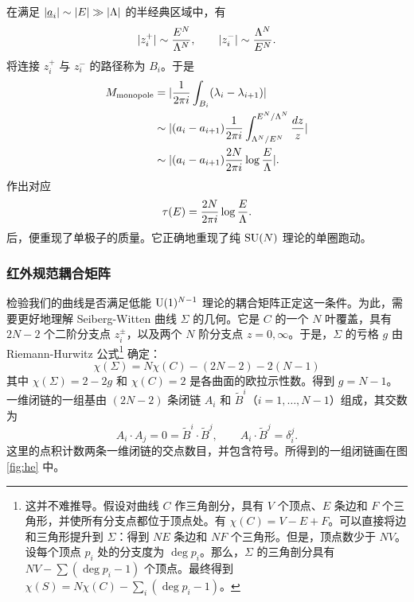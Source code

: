 在满足 $|\underline a_i|\sim|E|\gg|\Lambda|$ 的半经典区域中，有
\begin{equation}
|z_i^+|\sim\frac{E^N}{\Lambda^N},\qquad
|z_i^-|\sim\frac{\Lambda^N}{E^N}.
\end{equation}
将连接 $z_i^+$ 与 $z_i^-$ 的路径称为 $B_i$。于是
\begin{align}
M_\text{monopole}&=|\frac1{2\pi i}\int_{B_i}(\lambda_i-\lambda_{i+1})|\\
&\sim|(a_i-a_{i+1})\frac1{2\pi i}\int_{\Lambda^N/E^N}^{E^N/\Lambda^N}\frac{dz}z|\\
&\sim|(a_i-a_{i+1})\frac{2N}{2\pi i}\log\frac{E}\Lambda|.
\end{align}
作出对应
\begin{equation}
\tau(E)=\frac{2N}{2\pi i}\log\frac{E}\Lambda.
\end{equation}
后，便重现了单极子的质量。它正确地重现了纯 $\mathop{\mathrm{SU}}(N)$ 理论的单圈跑动。

\subsubsection{红外规范耦合矩阵}
检验我们的曲线是否满足低能 ${\mathrm{U}}(1)^{N-1}$ 理论的耦合矩阵正定这一条件。为此，需要更好地理解 Seiberg-Witten 曲线 $\Sigma$ 的几何。它是 $C$ 的一个 $N$ 叶覆盖，具有 $2N-2$ 个二阶分支点 $z_i^\pm$，以及两个 $N$ 阶分支点 $z=0,\infty$。于是，$\Sigma$ 的亏格 $g$ 由 Riemann-Hurwitz 公式\footnote{这并不难推导。假设对曲线 $C$ 作三角剖分，具有 $V$ 个顶点、$E$ 条边和 $F$ 个三角形，并使所有分支点都位于顶点处。有 $\chi(C)=V-E+F$。可以直接将边和三角形提升到 $\Sigma$：得到 $NE$ 条边和 $NF$ 个三角形。但是，顶点数少于 $NV$。设每个顶点 $p_i$ 处的分支度为 $\deg p_i$。那么，$\Sigma$ 的三角剖分具有 $NV-\sum(\deg p_i-1)$ 个顶点。最终得到 $\chi(S)=N\chi(C)-\sum_i(\deg p_i-1)$。} 确定：
\begin{equation}
\chi(\Sigma)=N\chi(C)-(2N-2)-2(N-1)
\end{equation}
其中 $\chi(\Sigma)=2-2g$ 和 $\chi(C)=2$ 是各曲面的欧拉示性数。得到 $g=N-1$。一维闭链的一组基由 $(2N-2)$ 条闭链 $A_i$ 和 $\tilde B^i$（$i=1,\ldots,N-1$）组成，其交数为
\begin{equation}
A_i\cdot A_j=0=\tilde B^i\cdot\tilde B^j,\qquad
A_i\cdot\tilde B^j=\delta_i^j.
\end{equation}
这里的点积计数两条一维闭链的交点数目，并包含符号。所得到的一组闭链画在图 \ref{fig:he} 中。

